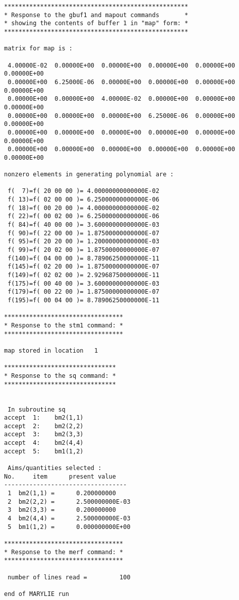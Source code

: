 \begin{footnotesize}
\begin{verbatim}
***************************************************
* Response to the gbuf1 and mapout commands       *
* showing the contents of buffer 1 in "map" form: *
***************************************************

matrix for map is :

 4.00000E-02  0.00000E+00  0.00000E+00  0.00000E+00  0.00000E+00  0.00000E+00
 0.00000E+00  6.25000E-06  0.00000E+00  0.00000E+00  0.00000E+00  0.00000E+00
 0.00000E+00  0.00000E+00  4.00000E-02  0.00000E+00  0.00000E+00  0.00000E+00
 0.00000E+00  0.00000E+00  0.00000E+00  6.25000E-06  0.00000E+00  0.00000E+00
 0.00000E+00  0.00000E+00  0.00000E+00  0.00000E+00  0.00000E+00  0.00000E+00
 0.00000E+00  0.00000E+00  0.00000E+00  0.00000E+00  0.00000E+00  0.00000E+00

nonzero elements in generating polynomial are :

 f(  7)=f( 20 00 00 )= 4.00000000000000E-02
 f( 13)=f( 02 00 00 )= 6.25000000000000E-06
 f( 18)=f( 00 20 00 )= 4.00000000000000E-02
 f( 22)=f( 00 02 00 )= 6.25000000000000E-06
 f( 84)=f( 40 00 00 )= 3.60000000000000E-03
 f( 90)=f( 22 00 00 )= 1.87500000000000E-07
 f( 95)=f( 20 20 00 )= 1.20000000000000E-03
 f( 99)=f( 20 02 00 )= 1.87500000000000E-07
 f(140)=f( 04 00 00 )= 8.78906250000000E-11
 f(145)=f( 02 20 00 )= 1.87500000000000E-07
 f(149)=f( 02 02 00 )= 2.92968750000000E-11
 f(175)=f( 00 40 00 )= 3.60000000000000E-03
 f(179)=f( 00 22 00 )= 1.87500000000000E-07
 f(195)=f( 00 04 00 )= 8.78906250000000E-11

*********************************
* Response to the stm1 command: *
*********************************

map stored in location   1

*******************************
* Response to the sq command: *
*******************************


 In subroutine sq
accept  1:    bm2(1,1)
accept  2:    bm2(2,2)
accept  3:    bm2(3,3)
accept  4:    bm2(4,4)
accept  5:    bm1(1,2)

 Aims/quantities selected :
No.     item      present value
----------------------------------
 1  bm2(1,1) =      0.200000000
 2  bm2(2,2) =      2.500000000E-03
 3  bm2(3,3) =      0.200000000
 4  bm2(4,4) =      2.500000000E-03
 5  bm1(1,2) =      0.000000000E+00

*********************************
* Response to the merf command: *
*********************************

 number of lines read =         100

end of MARYLIE run
\end{verbatim}
\end{footnotesize}

